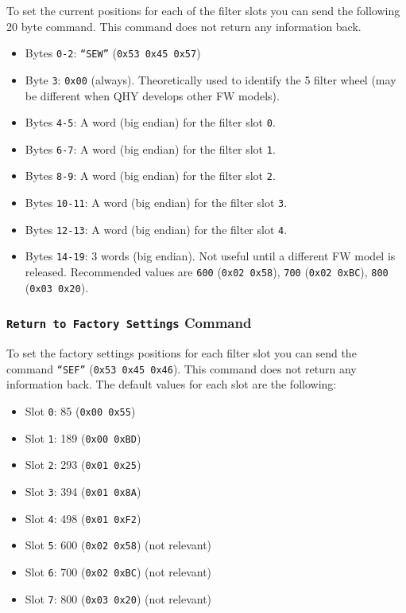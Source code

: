 \documentclass[a4paper,10pt]{article}
\begin{document}
To set the current positions for each of the filter slots you can send the following 20 byte command. This command does not return any information back.

\begin{itemize}
  \item Bytes \texttt{0-2}: \texttt{``SEW''} (\texttt{0x53 0x45 0x57})
  \item Byte \texttt{3}: \texttt{0x00} (always). Theoretically used to identify the 5 filter wheel (may be different when QHY develops other FW models).
  \item Bytes \texttt{4-5}: A word (big endian) for the filter slot \texttt{0}.
  \item Bytes \texttt{6-7}: A word (big endian) for the filter slot \texttt{1}.
  \item Bytes \texttt{8-9}: A word (big endian) for the filter slot \texttt{2}.
  \item Bytes \texttt{10-11}: A word (big endian) for the filter slot \texttt{3}.
  \item Bytes \texttt{12-13}: A word (big endian) for the filter slot \texttt{4}.
  \item Bytes \texttt{14-19}: 3 words (big endian). Not useful until a different FW model is released. Recommended values are \texttt{600} (\texttt{0x02 0x58}), \texttt{700} (\texttt{0x02 0xBC}), \texttt{800} (\texttt{0x03 0x20}). 
\end{itemize}


\subsubsection{\texttt{Return to Factory Settings} Command}

To set the factory settings positions for each filter slot you can send the command \texttt{``SEF''} (\texttt{0x53 0x45 0x46}). This command does not return any information back. The default values for each slot are the following:

\begin{itemize}
  \item Slot \texttt{0}: 85 (\texttt{0x00 0x55})
  \item Slot \texttt{1}: 189 (\texttt{0x00 0xBD})
  \item Slot \texttt{2}: 293 (\texttt{0x01 0x25})
  \item Slot \texttt{3}: 394 (\texttt{0x01 0x8A})
  \item Slot \texttt{4}: 498 (\texttt{0x01 0xF2})
  \item Slot \texttt{5}: 600 (\texttt{0x02 0x58}) (not relevant)
  \item Slot \texttt{6}: 700 (\texttt{0x02 0xBC}) (not relevant)
  \item Slot \texttt{7}: 800 (\texttt{0x03 0x20}) (not relevant)
\end{itemize}
\end{document}
